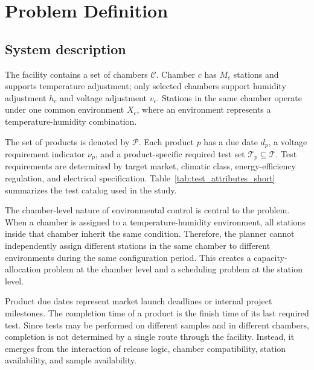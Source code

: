 \documentclass[11pt]{article}
\begin{document}
\section{Problem Definition}
\label{sec:pd}

\subsection{System description}
\label{subsec:system}

The facility contains a set of chambers \(\mathcal{C}\). Chamber \(c\) has \(M_c\) stations and supports temperature adjustment; only selected chambers support humidity adjustment \(h_c\) and voltage adjustment \(v_c\). Stations in the same chamber operate under one common environment \(X_c\), where an environment represents a temperature-humidity combination.

The set of products is denoted by \(\mathcal{P}\). Each product \(p\) has a due date \(d_p\), a voltage requirement indicator \(\nu_p\), and a product-specific required test set \(\mathcal{T}_p \subseteq \mathcal{T}\). Test requirements are determined by target market, climatic class, energy-efficiency regulation, and electrical specification. Table~\ref{tab:test_attributes_short} summarizes the test catalog used in the study.

The chamber-level nature of environmental control is central to the problem. When a chamber is assigned to a temperature-humidity environment, all stations inside that chamber inherit the same condition. Therefore, the planner cannot independently assign different stations in the same chamber to different environments during the same configuration period. This creates a capacity-allocation problem at the chamber level and a scheduling problem at the station level.

Product due dates represent market launch deadlines or internal project milestones. The completion time of a product is the finish time of its last required test. Since tests may be performed on different samples and in different chambers, completion is not determined by a single route through the facility. Instead, it emerges from the interaction of release logic, chamber compatibility, station availability, and sample availability.
\end{document}
